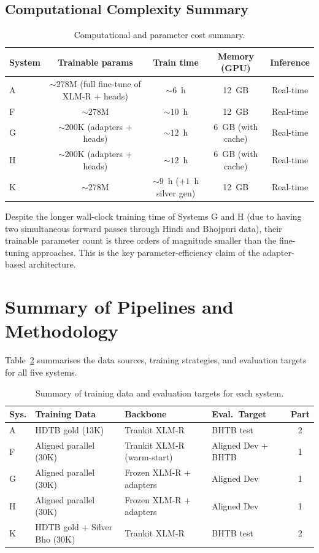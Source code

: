 \documentclass[12pt,a4paper,oneside]{report}
\begin{document}
\subsection{Computational Complexity Summary}

\begin{table}[ht]
\centering
\caption{Computational and parameter cost summary.}
\label{tab:compute}
\begin{tabular}{@{}lcccc@{}}
\toprule
\textbf{System} & \textbf{Trainable params} & \textbf{Train time} & \textbf{Memory (GPU)} & \textbf{Inference} \\
\midrule
A & ${\sim}278$M (full fine-tune of XLM-R + heads) & ${\sim}6$~h & 12~GB & Real-time \\
F & ${\sim}278$M & ${\sim}10$~h & 12~GB & Real-time \\
G & ${\sim}200$K (adapters + heads) & ${\sim}12$~h & 6~GB (with cache) & Real-time \\
H & ${\sim}200$K (adapters + heads) & ${\sim}12$~h & 6~GB (with cache) & Real-time \\
K & ${\sim}278$M & ${\sim}9$~h ($+1$~h silver gen) & 12~GB & Real-time \\
\bottomrule
\end{tabular}
\end{table}

Despite the longer wall-clock training time of Systems G and H (due to having
two simultaneous forward passes through Hindi and Bhojpuri data), their
trainable parameter count is three orders of magnitude smaller than the
fine-tuning approaches. This is the key parameter-efficiency claim of the
adapter-based architecture.

\section{Summary of Pipelines and Methodology}

Table~\ref{tab:pipeline_summary} summarises the data sources, training strategies,
and evaluation targets for all five systems.

\begin{table}[ht]
\centering
\caption{Summary of training data and evaluation targets for each system.}
\label{tab:pipeline_summary}
\begin{tabular}{@{}llllc@{}}
\toprule
\textbf{Sys.} & \textbf{Training Data} & \textbf{Backbone} & \textbf{Eval.\ Target} & \textbf{Part} \\
\midrule
A & HDTB gold (13K) & Trankit XLM-R & BHTB test & 2 \\
F & Aligned parallel (30K) & Trankit XLM-R (warm-start) & Aligned Dev + BHTB & 1 \\
G & Aligned parallel (30K) & Frozen XLM-R + adapters & Aligned Dev & 1 \\
H & Aligned parallel (30K) & Frozen XLM-R + adapters & Aligned Dev & 1 \\
K & HDTB gold + Silver Bho (30K) & Trankit XLM-R & BHTB test & 2 \\
\bottomrule
\end{tabular}
\end{table}
\end{document}
